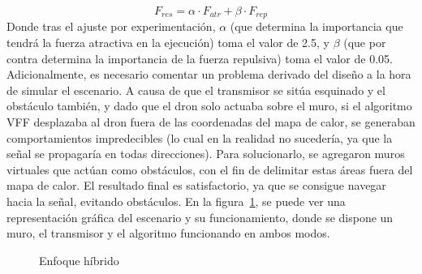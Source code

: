 \begin{equation}
    F_{res} = \alpha \cdot F_{atr} + \beta \cdot F_{rep}
    \label{eq:vff}
\end{equation}
Donde tras el ajuste por experimentación, $\alpha$ (que determina la importancia que tendrá la fuerza atractiva en la ejecución) toma el valor de 2.5, y $\beta$ (que por contra determina la importancia de la fuerza repulsiva) toma el valor de 0.05. Adicionalmente, es necesario comentar un problema derivado del diseño a la hora de simular el escenario. A causa de que el transmisor se sitúa esquinado y el obstáculo también, y dado que el dron solo actuaba sobre el muro, si el algoritmo \ac{VFF} desplazaba al dron fuera de las coordenadas del mapa de calor, se generaban comportamientos impredecibles (lo cual en la realidad no sucedería, ya que la señal se propagaría en todas direcciones). Para solucionarlo, se agregaron muros virtuales que actúan como obstáculos, con el fin de delimitar estas áreas fuera del mapa de calor. El resultado final es satisfactorio, ya que se consigue navegar hacia la señal, evitando obstáculos. En la figura~\ref{fig:hybrid}, se puede ver una representación gráfica del escenario y su funcionamiento, donde se dispone un muro, el transmisor y el algoritmo funcionando en ambos modos.
\begin{figure} [hp]
	\centering
	\quad
	\caption{Enfoque híbrido}
	\label{fig:hybrid}
\end{figure}